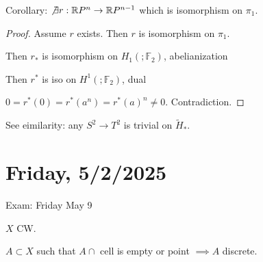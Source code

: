 \documentclass{article}
\theoremstyle{definition}
\begin{document}
    Corollary: \(\not\exists r: \mathbb{R} P^n \to \mathbb{R} P^{n-1}\) which is isomorphism on \(\pi_1\).

    \begin{proof}
        Assume \(r\) exists. Then \(r\) is isomorphism on \(\pi_1\).

        Then \(r_{\ast}\) is isomorphism on \(H_1(;\mathbb{F}_2)\), abelianization

        Then \(r^{\ast}\) is iso on \(H^1(;\mathbb{F}_2)\), dual

        \(0 = r^{\ast} (0) = r^{\ast}(a^n) = r^{\ast} (a)^n \neq 0\). Contradiction.

    \end{proof}

    See eimilarity: any \(S^2 \to T^2\) is trivial on \(\widetilde{H}_{\ast}\).

    \section*{Friday, 5/2/2025}
    
    Exam: Friday May 9

    \(X\) CW.

    \(A \subset X\) such that \(A \cap\) cell is empty or point \(\implies A\) discrete.

    
\end{document}
